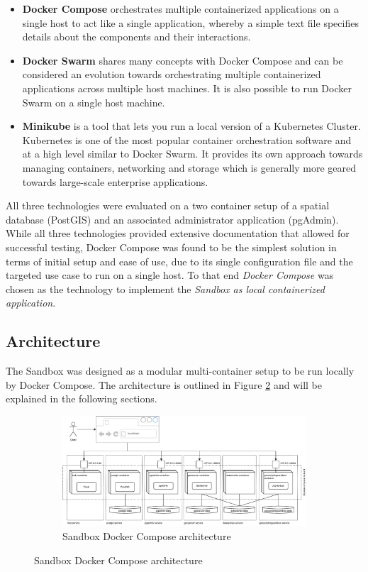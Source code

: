 \documentclass[11pt, a4paper, oneside, parskip=full-]{scrartcl}
\begin{document}
\begin{itemize}
  \item \textbf{Docker Compose} orchestrates multiple containerized applications
  on a single host to act like a single application, whereby a simple text file
  specifies details about the components and their interactions.
  \item \textbf{Docker Swarm}\cite{dockerswarm} shares many concepts with Docker
  Compose and can be considered an evolution towards orchestrating multiple
  containerized applications across multiple host machines. It is also possible
  to run Docker Swarm on a single host machine.
  \item \textbf{Minikube}\cite{minikube} is a tool that lets you run a local
  version of a Kubernetes Cluster. Kubernetes is one of the most popular
  container orchestration software and at a high level similar to Docker Swarm.
  It provides its own approach towards managing containers, networking and
  storage which is generally more geared towards large-scale enterprise
  applications.
\end{itemize}

All three technologies were evaluated on a two container setup of a spatial
database (PostGIS) and an associated administrator application (pgAdmin). While
all three technologies provided extensive documentation that allowed for
successful testing, Docker Compose was found to be the simplest solution in
terms of initial setup and ease of use, due to its single configuration file and
the targeted use case to run on a single host. To that end \emph{Docker Compose}
was chosen as the technology to implement the \emph{Sandbox as local
containerized application}.

\subsection{Architecture}
The Sandbox was designed as a modular multi-container setup to be run locally by
Docker Compose. The architecture is outlined in Figure \ref{fig:sandboxsetup}
and will be explained in the following sections. \\

 \begin{figure}
  \centering
  \begin{figure}[H]
    \centering
    \includegraphics[width=1\textwidth]{composeSetup}
    \caption{Sandbox Docker Compose architecture}
    \label{fig:sandboxsetup}
  \end{figure}
\end{figure}
\end{document}

